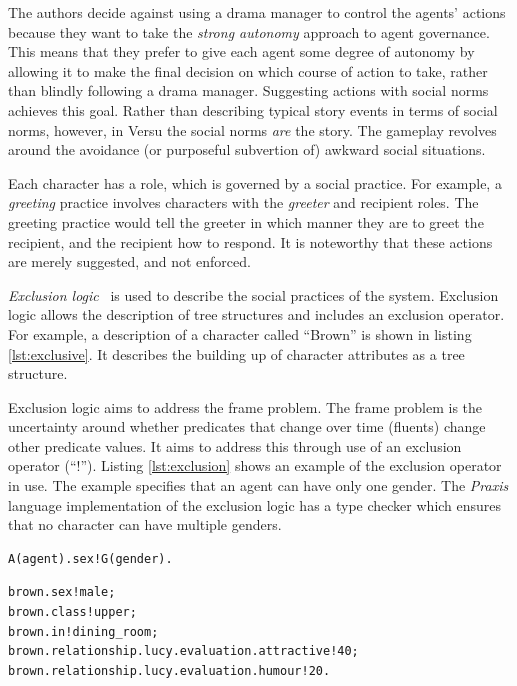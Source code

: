 The authors decide against using a drama manager to control the agents' actions because they want to take the \emph{strong autonomy} approach to agent governance. This means that they prefer to give each agent some degree of autonomy by allowing it to make the final decision on which course of action to take, rather than blindly following a drama manager. Suggesting actions with social norms achieves this goal. Rather than describing typical story events in terms of social norms, however, in Versu the social norms \emph{are} the story. The gameplay revolves around the avoidance (or purposeful subvertion of) awkward social situations.

Each character has a role, which is governed by a social practice. For example, a \emph{greeting} practice involves characters with the \emph{greeter} and recipient roles. The greeting practice would tell the greeter in which manner they are to greet the recipient, and the recipient how to respond. It is noteworthy that these actions are merely suggested, and not enforced.

\emph{Exclusion logic}~\cite{evans2010introducing} is used to describe the social practices of the system. Exclusion logic allows the description of tree structures and includes an exclusion operator. For example, a description of a character called ``Brown'' is shown in listing \ref{lst:exclusive}. It describes the building up of character attributes as a tree structure.

Exclusion logic aims to address the frame problem. The frame problem is the uncertainty around whether predicates that change over time (fluents) change other predicate values. It aims to address this through use of an exclusion operator (``!''). Listing \ref{lst:exclusion} shows an example of the exclusion operator in use. The example specifies that an agent can have only one gender. The \emph{Praxis} language implementation of the exclusion logic has a type checker which ensures that no character can have multiple genders.

\begin{lstlisting}[float,label=lst:exclusion,caption=nextHopInfo: caption]
A(agent).sex!G(gender).
\end{lstlisting}

\begin{lstlisting}[label=lst:exclusion,caption=Description of ``Brown'' character.]
brown.sex!male;
brown.class!upper;
brown.in!dining_room;
brown.relationship.lucy.evaluation.attractive!40;
brown.relationship.lucy.evaluation.humour!20.
\end{lstlisting}

